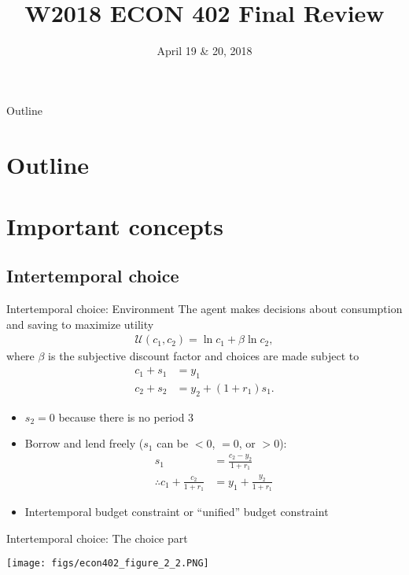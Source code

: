 \documentclass[presentation,dvipsnames]{beamer}
\author{}
\date{April 19 \& 20, 2018}
\title{W2018 ECON 402 Final Review}
\begin{document}
\maketitle
\begin{frame}{Outline}
\setcounter{tocdepth}{1}
\tableofcontents
\end{frame}

\section{Outline}
\label{sec-1}
\section{Important concepts}

\subsection{Intertemporal choice}
\label{sec-2}

\begin{frame}[label=sec-2-1]{Intertemporal choice: Environment}
The agent makes decisions about consumption and saving to maximize utility
\begin{align*}
\mathcal{U}(c_{1},c_{2}) = \ln c_{1} + \beta \ln c_{2},
\end{align*}
where $\beta$ is the subjective discount factor and choices are made subject to
\begin{align*}
c_{1} + s_{1} &= y_{1} \\
c_{2} + s_{2} &= y_{2} + (1+r_{1})s_{1}.
\end{align*}
\begin{itemize}[label={--}]
\item $s_{2} = 0$ because there is no period 3
\item Borrow and lend freely ($s_{1}$ can be $<0$, $=0$, or $>0$):
\begin{align*}
s_{1} &= \frac{c_{2}-y_{2}}{1+r_{1}} \\
\therefore c_{1} + \frac{c_{2}}{1+r_{1}} &= y_{1} + \frac{y_{2}}{1+r_{1}}
\end{align*}
\item Intertemporal budget constraint or ``unified'' budget constraint
\end{itemize}
\end{frame}

\begin{frame}[label=sec-2-1]{Intertemporal choice: The choice part}
\centerline{\texttt{[image: figs/econ402\_figure\_2\_2.PNG]}}
\end{frame}
\end{document}
